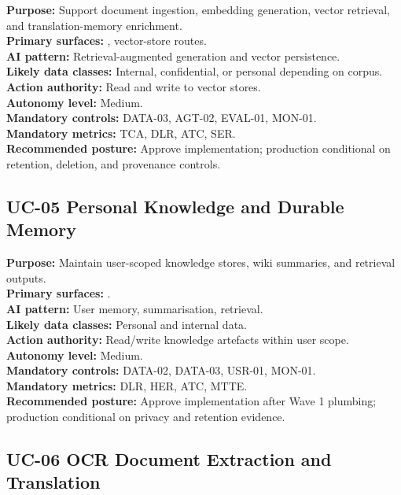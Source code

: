 \documentclass[11pt,a4paper]{article}
\begin{document}
\textbf{Purpose:} Support document ingestion, embedding generation, vector retrieval, and translation-memory enrichment.\\
\textbf{Primary surfaces:} , vector-store routes.\\
\textbf{AI pattern:} Retrieval-augmented generation and vector persistence.\\
\textbf{Likely data classes:} Internal, confidential, or personal depending on corpus.\\
\textbf{Action authority:} Read and write to vector stores.\\
\textbf{Autonomy level:} Medium.\\
\textbf{Mandatory controls:} DATA-03, AGT-02, EVAL-01, MON-01.\\
\textbf{Mandatory metrics:} TCA, DLR, ATC, SER.\\
\textbf{Recommended posture:} Approve implementation; production conditional on retention, deletion, and provenance controls.

\subsection{UC-05 Personal Knowledge and Durable Memory}

\textbf{Purpose:} Maintain user-scoped knowledge stores, wiki summaries, and retrieval outputs.\\
\textbf{Primary surfaces:} .\\
\textbf{AI pattern:} User memory, summarisation, retrieval.\\
\textbf{Likely data classes:} Personal and internal data.\\
\textbf{Action authority:} Read/write knowledge artefacts within user scope.\\
\textbf{Autonomy level:} Medium.\\
\textbf{Mandatory controls:} DATA-02, DATA-03, USR-01, MON-01.\\
\textbf{Mandatory metrics:} DLR, HER, ATC, MTTE.\\
\textbf{Recommended posture:} Approve implementation after Wave 1 plumbing; production conditional on privacy and retention evidence.

\subsection{UC-06 OCR Document Extraction and Translation}
\end{document}
